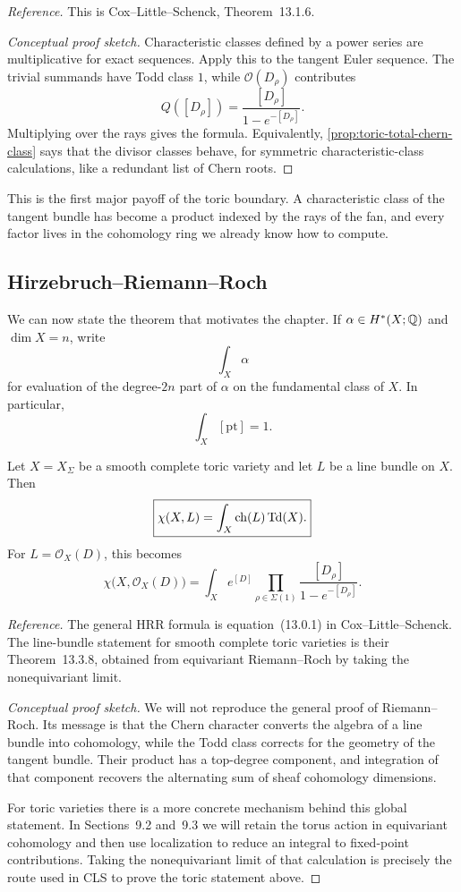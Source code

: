 \noindent
\textit{Reference.}
This is Cox--Little--Schenck, Theorem~13.1.6.

\begin{proof}[Conceptual proof sketch]
Characteristic classes defined by a power series are multiplicative
for exact sequences. Apply this to the tangent Euler sequence. The
trivial summands have Todd class \(1\), while
\(\mathcal O(D_\rho)\) contributes
\[
Q([D_\rho])
=
\frac{[D_\rho]}{1-e^{-[D_\rho]}}.
\]
Multiplying over the rays gives the formula. Equivalently,
\cref{prop:toric-total-chern-class} says that the divisor classes
behave, for symmetric characteristic-class calculations, like a
redundant list of Chern roots.
\end{proof}

This is the first major payoff of the toric boundary. A characteristic
class of the tangent bundle has become a product indexed by the rays of
the fan, and every factor lives in the cohomology ring we already know
how to compute.

\subsection{Hirzebruch--Riemann--Roch}

We can now state the theorem that motivates the chapter. If
\(\alpha\in H^*(X;\mathbb{Q})\) and \(\dim X=n\), write
\[
\int_X\alpha
\]
for evaluation of the degree-\(2n\) part of \(\alpha\) on the
fundamental class of \(X\). In particular,
\[
\int_X[\mathrm{pt}]=1.
\]

\begin{theorem}
\label{thm:toric-hrr}
Let \(X=X_\Sigma\) be a smooth complete toric variety and let \(L\) be
a line bundle on \(X\). Then
\[
\boxed{
\chi(X,L)
=
\int_X\operatorname{ch}(L)\operatorname{Td}(X).
}
\]
For \(L=\mathcal O_X(D)\), this becomes
\[
\boxed{
\chi\bigl(X,\mathcal O_X(D)\bigr)
=
\int_X
e^{[D]}
\prod_{\rho\in\Sigma(1)}
\frac{[D_\rho]}{1-e^{-[D_\rho]}}.
}
\]
\end{theorem}

\noindent
\textit{Reference.}
The general HRR formula is equation~(13.0.1) in
Cox--Little--Schenck. The line-bundle statement for smooth complete
toric varieties is their Theorem~13.3.8, obtained from equivariant
Riemann--Roch by taking the nonequivariant limit.

\begin{proof}[Conceptual proof sketch]
We will not reproduce the general proof of Riemann--Roch. Its message
is that the Chern character converts the algebra of a line bundle into
cohomology, while the Todd class corrects for the geometry of the
tangent bundle. Their product has a top-degree component, and
integration of that component recovers the alternating sum of sheaf
cohomology dimensions.

For toric varieties there is a more concrete mechanism behind this
global statement. In Sections~9.2 and~9.3 we will retain the torus
action in equivariant cohomology and then use localization to reduce an
integral to fixed-point contributions. Taking the nonequivariant limit
of that calculation is precisely the route used in CLS to prove the
toric statement above.
\end{proof}

